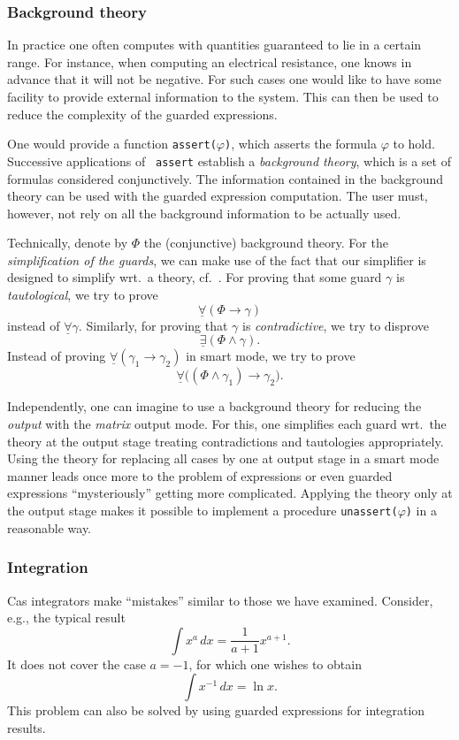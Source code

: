 \subsubsection{Background theory}\label{background}
In practice one often computes with quantities guaranteed to lie in a
certain range. For instance, when computing an electrical resistance,
one knows in advance that it will not be negative. For such cases one
would like to have some facility to provide external information to
the system. This can then be used to reduce the complexity of the
guarded expressions.

One would provide a function {\tt assert($\varphi$)}, which asserts
the formula {\tt $\varphi$} to hold. Successive applications of {\tt
assert} establish a {\em background theory}, which is a set of
formulas considered conjunctively. The information contained in the
background theory can be used with the guarded expression computation.
The user must, however, not rely on all the background information to
be actually used.

Technically, denote by $\Phi$ the (conjunctive) background theory. For
the {\em simplification of the guards}, we can make use of the fact
that our simplifier is designed to simplify wrt.~a theory,
cf.~\cite{DolzmannSturm:95}. For proving that some guard $\gamma$ is
{\em tautological}, we try to prove
$$\underline{\forall}(\Phi\longrightarrow\gamma)$$ instead of
$\underline{\forall}\gamma$. Similarly, for proving that $\gamma$ is
{\em contradictive}, we try to disprove
$$\underline{\exists}(\Phi\land\gamma).$$ Instead of proving
$\underline{\forall}(\gamma_1\longrightarrow\gamma_2)$ in smart mode, we try to
prove
$$\underline{\forall}\bigl((\Phi\land\gamma_1)\longrightarrow\gamma_2\bigr).$$

Independently, one can imagine to use a background theory for reducing
the {\em output} with the {\em matrix} output mode. For this, one
simplifies each guard wrt.~the theory at the output stage treating
contradictions and tautologies appropriately. Using the theory for
replacing all cases by one at output stage in a smart mode manner
leads once more to the problem of expressions or even guarded
expressions ``mysteriously'' getting more complicated. Applying the
theory only at the output stage makes it possible to implement a
procedure {\tt unassert($\varphi$)} in a reasonable way.
%
\subsubsection{Integration}\label{integration}
{\sc Cas} integrators make ``mistakes'' similar to those we have
examined. Consider, e.g., the typical result
$$
\int x^a\,dx=\frac{1}{a+1}x^{a+1}.
$$
It does not cover the case $a=-1$, for which one wishes to obtain
$$
\int x^{-1}\,dx=\ln x.
$$
This problem can also be solved by using guarded expressions for
integration results.

